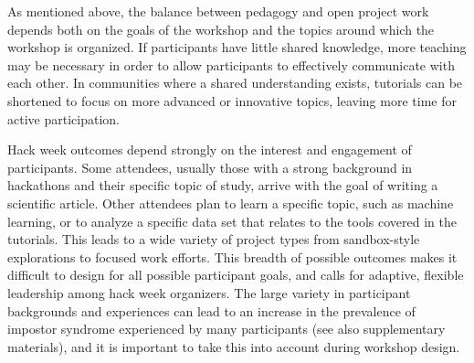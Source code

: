 As mentioned above, the balance between pedagogy and open project work depends both on the goals of the workshop and the topics around which the workshop is organized.
If participants have little shared knowledge, more teaching may be necessary in order to allow participants to effectively communicate with each other.
In communities where a shared understanding exists, tutorials can be shortened to focus on more advanced or innovative topics, leaving more time for active participation.

Hack week outcomes depend strongly on the interest and engagement of participants.
Some attendees, usually those with a strong background in hackathons and their specific topic of study, arrive with the goal of writing a scientific article.
Other attendees plan to learn a specific topic, such as machine learning, or to analyze a specific data set that relates to the tools covered in the tutorials.
This leads to a wide variety of project types from sandbox-style explorations to focused work efforts.
This breadth of possible outcomes makes it difficult to design for all possible participant goals, and calls for adaptive, flexible leadership among hack week organizers.
The large variety in participant backgrounds and experiences can lead to an increase in the prevalence of impostor syndrome experienced by many participants (see also supplementary materials), and it 
is important to take this into account during workshop design.
